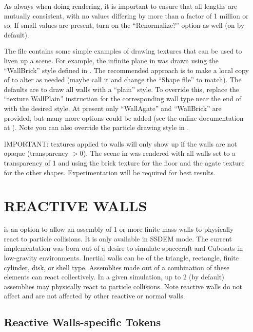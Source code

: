 As always when doing  rendering, it is important to
ensure that all  lengths are mutually consistent, with no
values differing by more than a factor of 1 million or so.  If small
values are present, turn on the  ``Renormalize?'' option
as well (on by default).

The  file contains some simple examples of drawing
textures that can be used to liven up a scene.  For example, the
infinite plane in  was drawn using the ``WallBrick'' style
defined in .  The recommended approach is to make a
local copy of  to alter as needed (maybe call it
 and change the  ``Shape file'' to
match).  The defaults are to draw all walls with a ``plain'' style.
To override this, replace the ``texture {WallPlain}'' instruction for
the corresponding wall type near the end of  with
the desired style.  At present only ``WallAgate'' and ``WallBrick''
are provided, but many more options could be added (see the online
 documentation at ).  Note you can also
override the particle drawing style in .

IMPORTANT: textures applied to walls will only show up if the walls
are not opaque (\ie transparency $> 0$).  The scene in  was
rendered with all walls set to a transparency of 1 and using the brick
texture for the floor and the agate texture for the other shapes.
Experimentation will be required for best results.

\section{REACTIVE WALLS} \label{s:react} %

 is an option to allow an assembly of 1 or
more finite-mass walls to physically react to particle collisions.  It
is only available in SSDEM mode.  The current implementation was born
out of a desire to simulate spacecraft and Cubesats in low-gravity
environments.  Inertial walls can be of the triangle, rectangle, finite
cylinder, disk, or shell type.  Assemblies made out of a combination
of these elements can react collectively.  In a given simulation, up
to 2 (by default) assemblies may physically react to particle
collisions.  Note reactive walls do not affect and are not affected by
other reactive or normal walls.

\subsection{Reactive Walls-specific Tokens}

